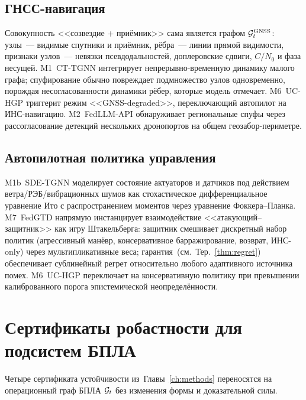\subsection{ГНСС-навигация}
\label{sec:uav_gnss}

Совокупность <<созвездие + приёмник>> сама является графом
$\mathcal{G}_t^{\text{GNSS}}$: узлы~--- видимые спутники и приёмник, рёбра~---
линии прямой видимости, признаки узлов~--- невязки псевдодальностей,
доплеровские сдвиги, $C/N_0$ и фаза несущей. \textsf{M1~CT-TGNN}
интегрирует непрерывно-временную динамику малого графа; спуфирование
обычно повреждает подмножество узлов одновременно, порождая
несогласованности динамики рёбер, которые модель отмечает.
\textsf{M6~UC-HGP} триггерит режим <<GNSS-degraded>>, переключающий
автопилот на ИНС-навигацию. \textsf{M2~FedLLM-API} обнаруживает
региональные спуфы через рассогласование детекций нескольких
дронопортов на общем геозабор-периметре.

\subsection{Автопилотная политика управления}
\label{sec:uav_autopilot}

\textsf{M1b~SDE-TGNN} моделирует состояние актуаторов и датчиков под
действием ветра/РЭБ/вибрационных шумов как стохастическое
дифференциальное уравнение Ито с распространением моментов через
уравнение Фоккера--Планка. \textsf{M7~FedGTD} напрямую инстанцирует
взаимодействие <<атакующий--защитник>> как игру Штакельберга:
защитник смешивает дискретный набор политик (агрессивный манёвр,
консервативное барражирование, возврат, ИНС-only) через
мультипликативные веса; гарантия~(см.\ Тер.~\ref{thm:regret}) обеспечивает
сублинейный регрет относительно любого адаптивного источника помех.
\textsf{M6~UC-HGP} переключает на консервативную политику при
превышении калиброванного порога эпистемической неопределённости.

\section{Сертификаты робастности для подсистем БПЛА}
\label{sec:uav_certs}

Четыре сертификата устойчивости из~Главы~\ref{ch:methods}
переносятся на операционный граф БПЛА $\mathcal{G}_t$ без изменения формы и
доказательной силы.

